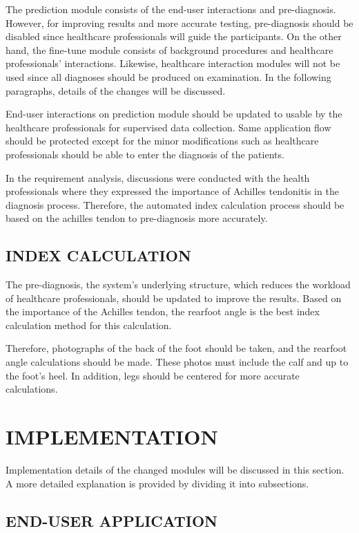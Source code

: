 The prediction module consists of the end-user interactions and pre-diagnosis. However, for improving results and more accurate testing, pre-diagnosis should be disabled since healthcare professionals will guide the participants. On the other hand, the fine-tune module consists of background procedures and healthcare professionals' interactions. Likewise, healthcare interaction modules will not be used since all diagnoses should be produced on examination. In the following paragraphs, details of the changes will be discussed.

End-user interactions on prediction module should be updated to usable by the healthcare professionals for supervised data collection. Same application flow should be protected except for the minor modifications such as healthcare professionals should be able to enter the diagnosis of the patients.

In the requirement analysis, discussions were conducted with the health professionals where they expressed the importance of Achilles tendonitis in the diagnosis process. Therefore, the automated index calculation process should be based on the achilles tendon to pre-diagnosis more accurately.

\subsection{ INDEX CALCULATION }

The pre-diagnosis, the system's underlying structure, which reduces the workload of healthcare professionals, should be updated to improve the results. Based on the importance of the Achilles tendon, the rearfoot angle is the best index calculation method for this calculation. 

Therefore, photographs of the back of the foot should be taken, and the rearfoot angle calculations should be made. These photos must include the calf and up to the foot's heel. In addition, legs should be centered for more accurate calculations.

\section{IMPLEMENTATION}\label{sec:StudyIIImplementation}

Implementation details of the changed modules will be discussed in this section. A more detailed explanation is provided by dividing it into subsections. 

\subsection{END-USER APPLICATION}

